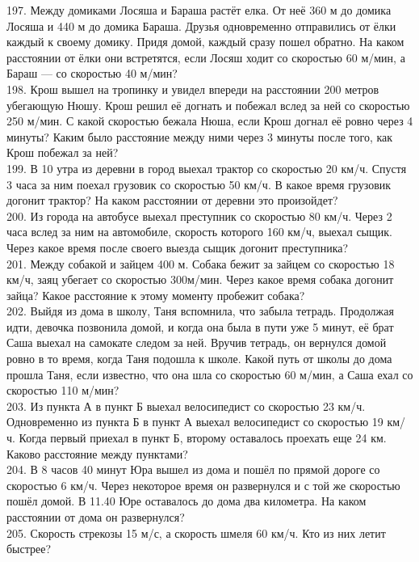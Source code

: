 \documentclass[12pt]{article}
\begin{document}
197. Между домиками Лосяша и Бараша растёт елка. От неё 360 м до домика Лосяша и 440 м до домика Бараша. Друзья одновременно отправились от ёлки каждый к своему домику. Придя домой, каждый сразу пошел обратно. На каком расстоянии от ёлки они встретятся, если Лосяш ходит со скоростью 60 м/мин, а Бараш --- со скоростью 40 м/мин?\\
198. Крош вышел на тропинку и увидел впереди на расстоянии 200 метров убегающую Нюшу. Крош решил её догнать и побежал вслед за ней со скоростью 250 м/мин. С какой скоростью бежала Нюша, если Крош догнал её ровно через 4 минуты? Каким было расстояние между ними через 3 минуты после того, как Крош побежал за ней?\\
199.  В 10 утра из деревни в город выехал трактор со скоростью 20 км/ч. Спустя 3 часа за ним поехал грузовик со скоростью 50 км/ч. В какое время грузовик догонит трактор? На каком расстоянии от деревни это произойдет?\\
200. Из города на автобусе выехал преступник со скоростью 80 км/ч. Через 2 часа вслед за ним на автомобиле, скорость которого 160 км/ч, выехал сыщик. Через какое время после своего выезда сыщик догонит преступника?\\
201.  Между собакой и зайцем 400 м. Собака бежит за зайцем со скоростью 18 км/ч, заяц убегает со скоростью 300м/мин. Через какое время собака догонит зайца? Какое расстояние к этому моменту пробежит собака?\\
202. Выйдя из дома в школу, Таня вспомнила, что забыла тетрадь. Продолжая идти, девочка позвонила домой, и когда она была в пути уже 5 минут, её брат Саша выехал на самокате следом за ней. Вручив тетрадь, он вернулся домой ровно в то время, когда Таня подошла к школе. Какой путь от школы до дома прошла Таня, если известно, что она шла со скоростью 60 м/мин, а Саша ехал со скоростью 110 м/мин?\\
203. Из пункта А в пункт Б выехал велосипедист со скоростью 23 км/ч. Одновременно из пункта Б в пункт А выехал велосипедист со скоростью 19 км/ч. Когда первый приехал в пункт Б, второму оставалось проехать еще 24 км. Каково расстояние между пунктами?\\
204. В 8 часов 40 минут Юра вышел из дома и пошёл по прямой дороге со скоростью 6 км/ч. Через некоторое время он развернулся и с той же скоростью пошёл домой. В 11.40 Юре оставалось до дома два километра. На каком расстоянии от дома он развернулся?\\
205. Скорость стрекозы 15 м/с, а скорость шмеля 60 км/ч. Кто из них летит быстрее?\\
\end{document}

